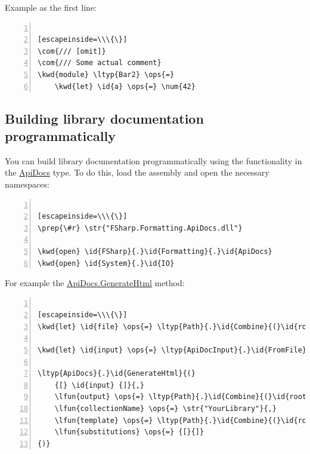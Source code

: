 \documentclass{article}
\newcommand{\id}[1]{\textcolor{black}{#1}}
\newcommand{\com}[1]{\textcolor{officegreen}{#1}}
\newcommand{\kwd}[1]{\textcolor{navy}{#1}}
\newcommand{\num}[1]{\textcolor{officegreen}{#1}}
\newcommand{\ops}[1]{\textcolor{purple}{#1}}
\newcommand{\prep}[1]{\textcolor{purple}{#1}}
\newcommand{\str}[1]{\textcolor{olive}{#1}}
\begin{document}
Example as the first line:
\begin{lstlisting}[numbers=left]

[escapeinside=\\\{\}]
\com{/// [omit]}
\com{/// Some actual comment}
\kwd{module} \ltyp{Bar2} \ops{=}
    \kwd{let} \id{a} \ops{=} \num{42}

\end{lstlisting}

\subsection*{Building library documentation programmatically}



You can build library documentation programmatically using the functionality
in the \href{https://fsprojects.github.io/FSharp.Formatting/reference/fsharp-formatting-apidocs-apidocs.html}{ApiDocs} type. To do this, load the assembly and open the necessary namespaces:
\begin{lstlisting}[numbers=left]

[escapeinside=\\\{\}]
\prep{\#r} \str{"FSharp.Formatting.ApiDocs.dll"}

\kwd{open} \id{FSharp}{.}\id{Formatting}{.}\id{ApiDocs}
\kwd{open} \id{System}{.}\id{IO}

\end{lstlisting}



For example the \href{https://fsprojects.github.io/FSharp.Formatting/reference/fsharp-formatting-apidocs-apidocs.html\#GenerateHtml}{ApiDocs.GenerateHtml} method:
\begin{lstlisting}[numbers=left]

[escapeinside=\\\{\}]
\kwd{let} \id{file} \ops{=} \ltyp{Path}{.}\id{Combine}{(}\id{root}{,} \str{"bin/YourLibrary.dll"}{)}

\kwd{let} \id{input} \ops{=} \ltyp{ApiDocInput}{.}\id{FromFile}{(}\id{file}{)}

\ltyp{ApiDocs}{.}\id{GenerateHtml}{(}
    {[} \id{input} {]}{,}
    \lfun{output} \ops{=} \ltyp{Path}{.}\id{Combine}{(}\id{root}{,} \str{"output"}{)}{,}
    \lfun{collectionName} \ops{=} \str{"YourLibrary"}{,}
    \lfun{template} \ops{=} \ltyp{Path}{.}\id{Combine}{(}\id{root}{,} \str{"templates"}{,} \str{"template.html"}{)}{,}
    \lfun{substitutions} \ops{=} {[}{]}
{)}

\end{lstlisting}
\end{document}
